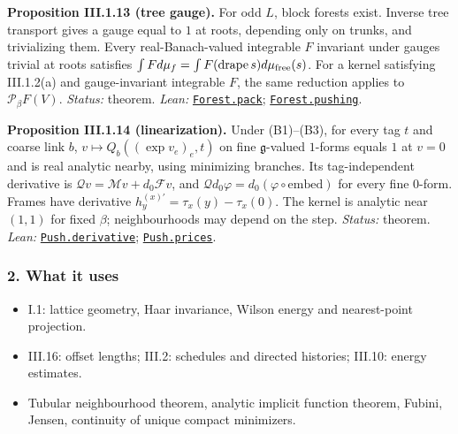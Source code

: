 \documentclass[
  letterpaper,
  11pt]{article}
\providecommand{\tightlist}{%
  \setlength{\itemsep}{0pt}\setlength{\parskip}{0pt}}
\begin{document}
\textbf{Proposition III.1.13 (tree gauge).} For odd \(L\), block forests
exist. Inverse tree transport gives a gauge equal to \(1\) at roots,
depending only on trunks, and trivializing them. Every
real-Banach-valued integrable \(F\) invariant under gauges trivial at
roots satisfies
\(\int Fd\mu_f=\int F(\mathrm{drape}\,s)d\mu_{\rm free}(s)\). For a
kernel satisfying III.1.2(a) and gauge-invariant integrable \(F\), the
same reduction applies to \(\mathcal P_\beta F(V)\). \emph{Status:}
theorem. \emph{Lean:}
\href{https://github.com/yang-mills-group/OpenAI-YM-20261028/blob/3456e5e75cf8d4cd558955a5c7638fba2d68f464/YM/Tree/Cut.lean\#L81-L111}{\texttt{Forest.pack}};
\href{https://github.com/yang-mills-group/OpenAI-YM-20261028/blob/3456e5e75cf8d4cd558955a5c7638fba2d68f464/YM/Tree/Cut.lean\#L114-L120}{\texttt{Forest.pushing}}.

\textbf{Proposition III.1.14 (linearization).} Under (B1)--(B3), for
every tag \(t\) and coarse link \(b\), \(v\mapsto Q_b((\exp v_e)_e,t)\)
on fine \(\mathfrak g\)-valued \(1\)-forms equals \(1\) at \(v=0\) and
is real analytic nearby, using minimizing branches. Its tag-independent
derivative is \(\mathcal Qv=\mathcal Mv+d_0\mathcal Fv\), and
\(\mathcal Qd_0\varphi=d_0(\varphi\circ\mathrm{embed})\) for every fine
\(0\)-form. Frames have derivative
\(h_y^{(x)\prime}=\tau_x(y)-\tau_x(0)\). The kernel is analytic near
\((1,1)\) for fixed \(\beta\); neighbourhoods may depend on the step.
\emph{Status:} theorem. \emph{Lean:}
\href{https://github.com/yang-mills-group/OpenAI-YM-20261028/blob/3456e5e75cf8d4cd558955a5c7638fba2d68f464/YM/PREC/Derivative.lean\#L38-L68}{\texttt{Push.derivative}};
\href{https://github.com/yang-mills-group/OpenAI-YM-20261028/blob/3456e5e75cf8d4cd558955a5c7638fba2d68f464/YM/PREC/Derivative.lean\#L147-L160}{\texttt{Push.prices}}.

\subsubsection{2. What it uses}\label{what-it-uses-3}

\begin{itemize}
\tightlist
\item
  I.1: lattice geometry, Haar invariance, Wilson energy and
  nearest-point projection.
\item
  III.16: offset lengths; III.2: schedules and directed histories;
  III.10: energy estimates.
\item
  Tubular neighbourhood theorem, analytic implicit function theorem,
  Fubini, Jensen, continuity of unique compact minimizers.
\end{itemize}
\end{document}
